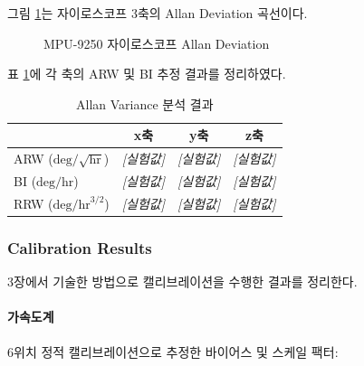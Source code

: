             그림 \ref{fig:avar_result}는 자이로스코프 3축의 Allan Deviation 곡선이다.\\
            
            \begin{figure}[H]
                \centering
                \caption{MPU-9250 자이로스코프 Allan Deviation}
                \label{fig:avar_result}
            \end{figure}
            
            표 \ref{tab:avar_result}에 각 축의 ARW 및 BI 추정 결과를 정리하였다.\\

            \begin{table}[H]
                \centering
                \caption{Allan Variance 분석 결과}
                \label{tab:avar_result}
                \begin{tabular}{lccc}
                    \toprule
                    & x축 & y축 & z축 \\
                    \midrule
                    ARW ($\text{deg}/\sqrt{\text{hr}}$) & \textit{[실험값]} & \textit{[실험값]} & \textit{[실험값]} \\
                    BI ($\text{deg}/\text{hr}$)         & \textit{[실험값]} & \textit{[실험값]} & \textit{[실험값]} \\
                    RRW ($\text{deg}/\text{hr}^{3/2}$)  & \textit{[실험값]} & \textit{[실험값]} & \textit{[실험값]} \\
                    \bottomrule
                \end{tabular}
            \end{table}

        \subsubsection{Calibration Results}
            3장에서 기술한 방법으로 캘리브레이션을 수행한 결과를 정리한다.
        
            \paragraph{가속도계}
                6위치 정적 캘리브레이션으로 추정한 바이어스 및 스케일 팩터:
            
